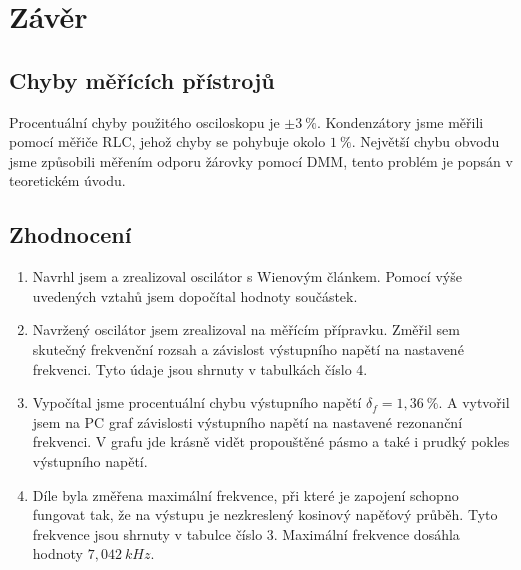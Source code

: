 \section*{Závěr}
  
  
  \subsection*{Chyby měřících přístrojů}
    \indent\indent
    Procentuální chyby použitého osciloskopu je $\pm 3~\%$. Kondenzátory jsme měřili pomocí měřiče RLC, jehož chyby se pohybuje okolo $1~\%$. Největší chybu obvodu jsme způsobili měřením odporu žárovky pomocí DMM, tento problém je popsán v teoretickém úvodu.
  
  \subsection*{Zhodnocení}
    \begin{enumerate}
      \item
        Navrhl jsem a zrealizoval oscilátor s Wienovým článkem. Pomocí výše uvedených vztahů jsem dopočítal hodnoty součástek.
      \item
        Navržený oscilátor jsem zrealizoval na měřícím přípravku. Změřil sem skutečný frekvenční rozsah a závislost výstupního napětí na nastavené frekvenci. Tyto údaje jsou shrnuty v tabulkách číslo 4.
      \item
      	Vypočítal jsme procentuální chybu výstupního napětí $\delta_f = 1,36~\%$. A vytvořil jsem na PC graf závislosti výstupního napětí na nastavené rezonanční frekvenci. V grafu jde krásně vidět propouštěné pásmo a také i prudký pokles výstupního napětí.
      \item
        Díle byla změřena maximální frekvence, při které je zapojení schopno fungovat tak, že na výstupu je nezkreslený kosinový napěťový průběh. Tyto frekvence jsou shrnuty v tabulce číslo 3. Maximální frekvence dosáhla hodnoty $7,042~kHz$.
  \end{enumerate}
